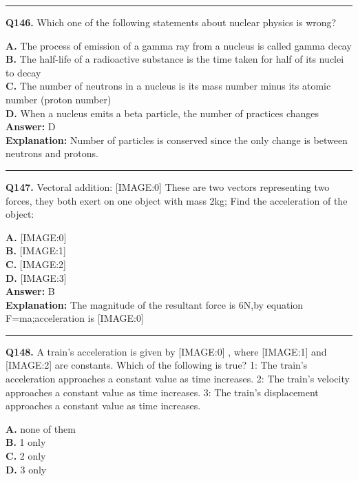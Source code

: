 \documentclass[12pt]{article}
\begin{document}
\hrule
\vspace{1em}


\noindent
\textbf{Q146.} Which one of the following statements about nuclear physics is wrong?



\textbf{A.} The process of emission of a gamma ray from a nucleus is called gamma decay \\
\textbf{B.} The half-life of a radioactive substance is the time taken for half of its nuclei to decay \\
\textbf{C.} The number of neutrons in a nucleus is its mass number minus its atomic number (proton number) \\
\textbf{D.} When a nucleus emits a beta particle, the number of practices changes \\

\textbf{Answer:} D \\
\textbf{Explanation:} Number of particles is conserved since the only change is between neutrons and protons.

\hrule
\vspace{1em}


\noindent
\textbf{Q147.} Vectoral addition:
[IMAGE:0]
These are two vectors representing two forces, they both exert on one object with mass 2kg; Find the acceleration of the object:



\textbf{A.} [IMAGE:0] \\
\textbf{B.} [IMAGE:1] \\
\textbf{C.} [IMAGE:2] \\
\textbf{D.} [IMAGE:3] \\

\textbf{Answer:} B \\
\textbf{Explanation:} The magnitude of the resultant force is 6N,by equation F=ma;acceleration is
[IMAGE:0]

\hrule
\vspace{1em}


\noindent
\textbf{Q148.} A train's acceleration is given by
[IMAGE:0]
, where
[IMAGE:1]
and
[IMAGE:2]
are constants. Which of the following is true?
1: The train's acceleration approaches a constant value as time increases.
2: The train's velocity approaches a constant value as time increases.
3: The train's displacement approaches a constant value as time increases.



\textbf{A.} none of them \\
\textbf{B.} 1 only \\
\textbf{C.} 2 only \\
\textbf{D.} 3 only \\
\end{document}

